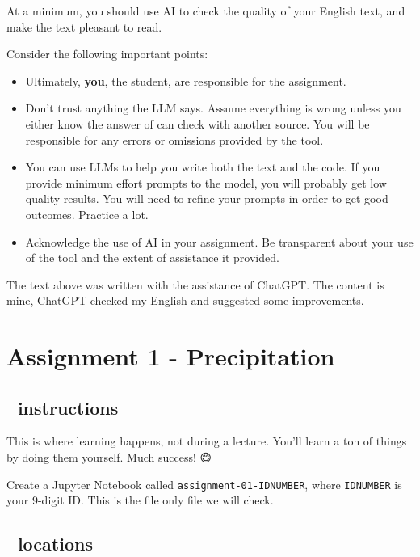 \documentclass[
  letterpaper,
  DIV=11,
  numbers=noendperiod]{scrreprt}
\providecommand{\tightlist}{%
  \setlength{\itemsep}{0pt}\setlength{\parskip}{0pt}}\usepackage{longtable,booktabs,array}
\begin{document}
At a minimum, you should use AI to check the quality of your English
text, and make the text pleasant to read.

Consider the following important points:

\begin{itemize}
\tightlist
\item
  Ultimately, \textbf{you}, the student, are responsible for the
  assignment.
\item
  Don't trust anything the LLM says. Assume everything is wrong unless
  you either know the answer of can check with another source. You will
  be responsible for any errors or omissions provided by the tool.
\item
  You can use LLMs to help you write both the text and the code. If you
  provide minimum effort prompts to the model, you will probably get low
  quality results. You will need to refine your prompts in order to get
  good outcomes. Practice a lot.
\item
  Acknowledge the use of AI in your assignment. Be transparent about
  your use of the tool and the extent of assistance it provided.
\end{itemize}

The text above was written with the assistance of ChatGPT. The content
is mine, ChatGPT checked my English and suggested some improvements.

\hypertarget{assignment-1---precipitation}{%
\chapter{Assignment 1 -
Precipitation}\label{assignment-1---precipitation}}

\hypertarget{instructions}{%
\section{📒 instructions}\label{instructions}}

This is where learning happens, not during a lecture. You'll learn a ton
of things by doing them yourself. Much success! 😄

Create a Jupyter Notebook called \texttt{assignment-01-IDNUMBER}, where
\texttt{IDNUMBER} is your 9-digit ID. This is the file only file we will
check.

\hypertarget{locations}{%
\section{📌 locations}\label{locations}}
\end{document}
